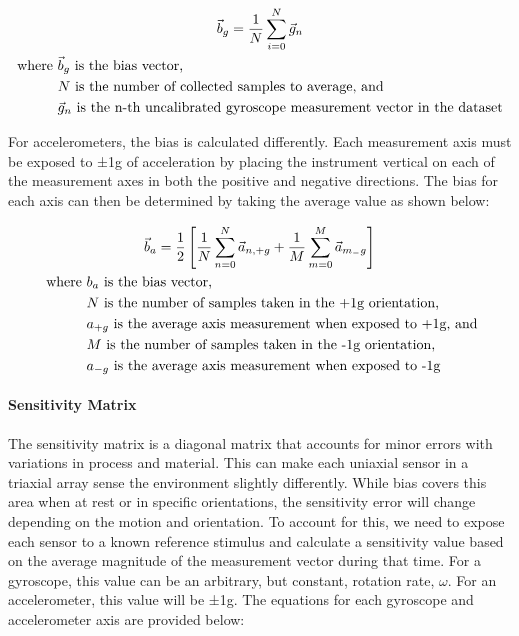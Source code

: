 \begin{gather} \labeq{gyroscope_bias}
    \vec{b}_g = \frac{1}{N} \sum_{i=0}^N{\vec{g}_n} \\
    \begin{aligned}
        \text{where } & \vec{b}_g \text{ is the bias vector,} \\
        & N \text{ is the number of collected samples to average, and} \\
        & \vec{g}_n \text{ is the n-th uncalibrated gyroscope measurement vector in the dataset}
    \end{aligned} \notag
\end{gather}

For accelerometers, the bias is calculated differently. Each measurement axis must be exposed to ±1g of acceleration by placing the instrument vertical on each of the measurement axes in both the positive and negative directions. The bias for each axis can then be determined by taking the average value as shown below:

\begin{gather} \labeq{accelerometer_bias}
    \vec{b}_a = \frac{1}{2} \left[ \frac{1}{N}\sum_{n=0}^N{\vec{a}_{n,+g}} + \frac{1}{M}\sum_{m=0}^M{\vec{a}_{m_-g}} \right] \\\
    \begin{aligned}
        \text{where } & b_a \text{ is the bias vector,} \\
        & N \text{ is the number of samples taken in the +1g orientation,} \\
        & a_{+g} \text{ is the average axis measurement when exposed to +1g, and}\\
        & M \text{ is the number of samples taken in the -1g orientation,} \\
        & a_{-g} \text{ is the average axis measurement when exposed to -1g}
    \end{aligned} \notag
\end{gather}

\paragraph*{Sensitivity Matrix} The sensitivity matrix is a diagonal matrix that accounts for minor errors with variations in process and material. 
This can make each uniaxial sensor in a triaxial array sense the environment slightly differently. 
While bias covers this area when at rest or in specific orientations, the sensitivity error will change depending on the motion and orientation. 
To account for this, we need to expose each sensor to a known reference stimulus and calculate a sensitivity value based on the average magnitude of the measurement vector during that time. 
For a gyroscope, this value can be an arbitrary, but constant, rotation rate, $\omega$. 
For an accelerometer, this value will be ±1g. The equations for each gyroscope and accelerometer axis are provided below:

